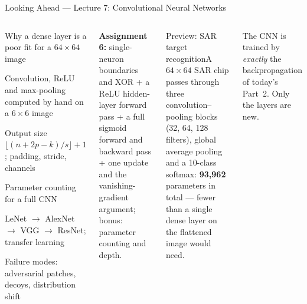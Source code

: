 \documentclass[aspectratio=169,10pt]{beamer}
\begin{document}
\begin{frame}{Looking Ahead --- Lecture 7: Convolutional Neural Networks}
\begin{columns}[T]
\begin{tl}\item Why a dense layer is a poor fit for a $64\times64$ image\item Convolution, ReLU and max-pooling computed by hand on a $6\times6$ image\item Output size $\lfloor(n+2p-k)/s\rfloor+1$; padding, stride, channels\item Parameter counting for a full CNN\item LeNet $\to$ AlexNet $\to$ VGG $\to$ ResNet; transfer learning\item Failure modes: adversarial patches, decoys, distribution shift\end{tl}
\begin{ibox}\scriptsize\textbf{Assignment 6:} single-neuron boundaries and XOR + a ReLU hidden-layer forward pass + a full sigmoid forward and backward pass + one update and the vanishing-gradient argument; bonus: parameter counting and depth.\end{ibox}
\begin{cbox}{Preview: SAR target recognition}\scriptsize A $64\times64$ SAR chip passes through three convolution--pooling blocks (32, 64, 128 filters), global average pooling and a 10-class softmax: \textbf{93,962} parameters in total --- fewer than a single dense layer on the flattened image would need.\end{cbox}
\begin{rbox}\scriptsize The CNN is trained by \emph{exactly} the backpropagation of today's Part~2. Only the layers are new.\end{rbox}
\end{columns}
\end{frame}
\end{document}
